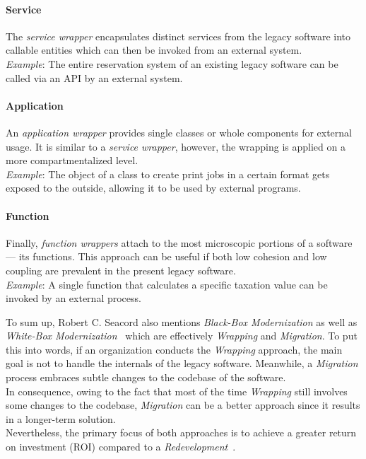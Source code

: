 \documentclass[12pt,a4paper,twoside]{report}
\begin{document}
\paragraph{Service}
The \textit{service wrapper} encapsulates distinct services from the legacy software
into callable entities which can then be invoked from an external system.\\
\textit{Example}: The entire reservation system of an existing legacy software
can be called via an API by an external system.

\paragraph{Application}
An \textit{application wrapper} provides single classes or whole components for external usage.
It is similar to a \textit{service wrapper}, however, the wrapping is applied on a more
compartmentalized level.\\
\textit{Example}: The object of a class to create print jobs in a certain format
gets exposed to the outside, allowing it to be used by external programs.

\paragraph{Function}
Finally, \textit{function wrappers} attach to the most microscopic portions of a software ---
its functions. This approach can be useful if both low cohesion and low coupling are prevalent
in the present legacy software.\\
\textit{Example}: A single function that calculates a specific taxation value
can be invoked by an external process.
\newline

To sum up, Robert C. Seacord also mentions \textit{Black-Box Modernization} as well as
\textit{White-Box Modernization}~\cite{seacord-modernizing-legacy} which are
effectively \textit{Wrapping} and \textit{Migration}. To put this into words,
if an organization conducts the \textit{Wrapping} approach, the main goal is not
to handle the internals of the legacy software.
Meanwhile, a \textit{Migration} process embraces subtle changes to the codebase of the software.\\
In consequence, owing to the fact that most of the time \textit{Wrapping} still
involves some changes to the codebase, \textit{Migration} can be a better
approach since it results in a longer-term solution.\\
Nevertheless, the primary focus of both approaches is to achieve a greater
return on investment (ROI) compared to a \textit{Redevelopment}~\cite{tilley-perspectives-reengineering}.
\end{document}
